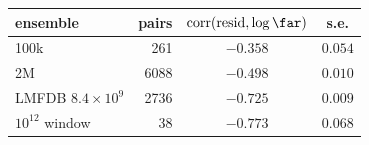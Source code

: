 \begin{tabular}{@{}lrcc@{}}
\toprule
ensemble & pairs & $\operatorname{corr}(\text{resid},\log\far)$ & s.e.\\
\midrule
100k & 261 & $-0.358$ & $0.054$\\
2M & 6088 & $-0.498$ & $0.010$\\
LMFDB $8.4\times10^{9}$ & 2736 & $-0.725$ & $0.009$\\
$10^{12}$ window & 38 & $-0.773$ & $0.068$\\
\bottomrule
\end{tabular}
